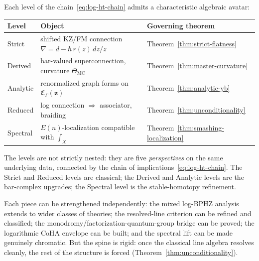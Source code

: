 \begin{convention}
%
Each level of the chain~\eqref{eq:log-ht-chain} admits a
characteristic algebraic avatar:
\begin{center}
\renewcommand{\arraystretch}{1.3}
\begin{tabular}{lll}
\textbf{Level} & \textbf{Object} & \textbf{Governing theorem} \\
\hline
Strict & shifted KZ/FM connection $\nabla = d - \hbar\,r(z)\,dz/z$
 & Theorem~\ref{thm:strict-flatness} \\
Derived & bar-valued superconnection, curvature $\Theta_{\mathrm{MC}}$
 & Theorem~\ref{thm:master-curvature} \\
Analytic & renormalized graph forms on $\mathfrak{C}_\Gamma(\mathbf{z})$
 & Theorem~\ref{thm:analytic-yb} \\
Reduced & log connection $\Rightarrow$ associator, braiding
 & Theorem~\ref{thm:unconditionality} \\
Spectral & $E(n)$-localization compatible with $\int_X$
 & Theorem~\ref{thm:smashing-localization}
\end{tabular}
\end{center}
The levels are not strictly nested: they are five \emph{perspectives}
on the same underlying data, connected by the chain of
implications~\eqref{eq:log-ht-chain}. The Strict and Reduced
levels are classical; the Derived and Analytic levels are the
bar-complex upgrades; the Spectral level is the stable-homotopy
refinement.
\end{convention}

Each piece can be strengthened independently: the mixed log-BPHZ
analysis extends to wider classes of theories; the resolved-line
criterion can be refined and classified; the
monodromy/factorization-quantum-group bridge can be proved; the
logarithmic CoHA envelope can be built; and the spectral lift can
be made genuinely chromatic. But the spine is rigid: once the
classical line algebra resolves cleanly, the rest of the structure
is forced (Theorem~\ref{thm:unconditionality}).


